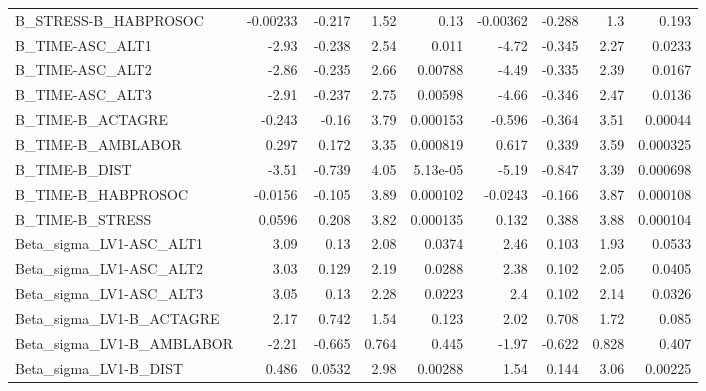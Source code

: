 \begin{tabular}{lrrrrrrrr}
B\_STRESS-B\_HABPROSOC          &    -0.00233 &       -0.217 &    1.52 &     0.13 &   -0.00362 &      -0.288 &          1.3 &         0.193 \\
B\_TIME-ASC\_ALT1               &       -2.93 &       -0.238 &    2.54 &    0.011 &      -4.72 &      -0.345 &         2.27 &        0.0233 \\
B\_TIME-ASC\_ALT2               &       -2.86 &       -0.235 &    2.66 &  0.00788 &      -4.49 &      -0.335 &         2.39 &        0.0167 \\
B\_TIME-ASC\_ALT3               &       -2.91 &       -0.237 &    2.75 &  0.00598 &      -4.66 &      -0.346 &         2.47 &        0.0136 \\
B\_TIME-B\_ACTAGRE              &      -0.243 &        -0.16 &    3.79 & 0.000153 &     -0.596 &      -0.364 &         3.51 &       0.00044 \\
B\_TIME-B\_AMBLABOR             &       0.297 &        0.172 &    3.35 & 0.000819 &      0.617 &       0.339 &         3.59 &      0.000325 \\
B\_TIME-B\_DIST                 &       -3.51 &       -0.739 &    4.05 & 5.13e-05 &      -5.19 &      -0.847 &         3.39 &      0.000698 \\
B\_TIME-B\_HABPROSOC            &     -0.0156 &       -0.105 &    3.89 & 0.000102 &    -0.0243 &      -0.166 &         3.87 &      0.000108 \\
B\_TIME-B\_STRESS               &      0.0596 &        0.208 &    3.82 & 0.000135 &      0.132 &       0.388 &         3.88 &      0.000104 \\
Beta\_sigma\_LV1-ASC\_ALT1       &        3.09 &         0.13 &    2.08 &   0.0374 &       2.46 &       0.103 &         1.93 &        0.0533 \\
Beta\_sigma\_LV1-ASC\_ALT2       &        3.03 &        0.129 &    2.19 &   0.0288 &       2.38 &       0.102 &         2.05 &        0.0405 \\
Beta\_sigma\_LV1-ASC\_ALT3       &        3.05 &         0.13 &    2.28 &   0.0223 &        2.4 &       0.102 &         2.14 &        0.0326 \\
Beta\_sigma\_LV1-B\_ACTAGRE      &        2.17 &        0.742 &    1.54 &    0.123 &       2.02 &       0.708 &         1.72 &         0.085 \\
Beta\_sigma\_LV1-B\_AMBLABOR     &       -2.21 &       -0.665 &   0.764 &    0.445 &      -1.97 &      -0.622 &        0.828 &         0.407 \\
Beta\_sigma\_LV1-B\_DIST         &       0.486 &       0.0532 &    2.98 &  0.00288 &       1.54 &       0.144 &         3.06 &       0.00225 \\

\end{tabular}
